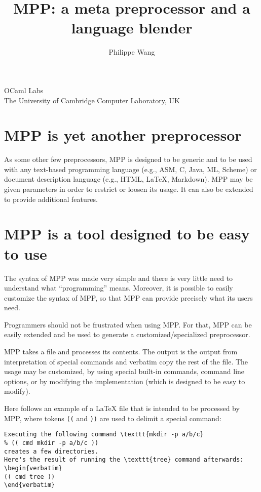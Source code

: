 \documentclass[a4paper]{article}
\title{MPP: a meta preprocessor and a language blender}
\author{Philippe Wang}
\begin{document}
\maketitle
\begin{center}
  OCaml Labs\\
  The University of Cambridge Computer Laboratory, UK\\
\end{center}
\section{MPP is yet another preprocessor}
As some other few preprocessors, MPP
is  designed  to  be  generic  and  to be  used  with  any  text-based
programming  language (e.g.,  ASM, C,  Java, ML,  Scheme)  or document
description language  (e.g., HTML, LaTeX, Markdown). MPP  may be given
parameters in  order to restrict or  loosen its usage. It  can also be
extended to provide additional features.

\section{MPP is a tool designed to be easy to use}

The syntax of MPP was made very simple and there is very little need
to understand what ``programming'' means.  Moreover, it is possible to
easily customize the syntax of MPP, so that MPP can provide precisely
what its users need.

Programmers should not be frustrated when using MPP. For that, MPP can
be easily  extended and be  used to generate  a customized/specialized
preprocessor.

MPP takes a file and processes its contents.  The output is the output
from interpretation of special commands  and verbatim copy the rest of
the  file.  The  usage may  be customized,  by using  special built-in
commands,  command line  options, or  by modifying  the implementation
(which is designed to be easy to modify).

Here  follows an  example  of a  LaTeX  file that  is  intended to  be
processed by MPP, where tokens \texttt{((} and \texttt{))} are used to
delimit a special command:
\begin{lstlisting}
Executing the following command \texttt{mkdir -p a/b/c} 
% (( cmd mkdir -p a/b/c ))
creates a few directories.
Here's the result of running the \texttt{tree} command afterwards:
\begin{verbatim}
(( cmd tree ))
\end{verbatim}
\end{lstlisting}
\end{document}

